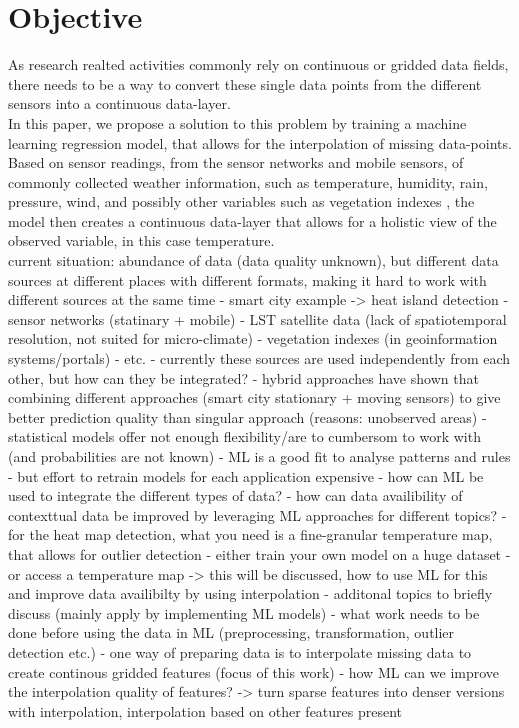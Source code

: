 \section{Objective}

As research realted activities commonly rely on continuous or gridded data fields, there needs to be a way to convert these single data points from the different sensors into a continuous data-layer.\\
In this paper, we propose a solution to this problem by training a machine learning regression model, that allows for the interpolation of missing data-points. Based on sensor readings, from the sensor networks and mobile sensors, of commonly collected weather information, such as temperature, humidity, rain, pressure, wind, and possibly other variables such as vegetation indexes \cite{alonso2020new}, the model then creates a continuous data-layer that allows for a holistic view of the observed variable, in this case temperature.\\

current situation: abundance of data (data quality unknown), but different data sources at different places with different formats, making it hard to work with different sources at the same time
- smart city example -> heat island detection
    - sensor networks (statinary + mobile)
    - LST satellite data (lack of spatiotemporal resolution, not suited for micro-climate)
    - vegetation indexes (in geoinformation systems/portals)
    - etc.
- currently these sources are used independently from each other, but how can they be integrated?
    - hybrid approaches have shown that combining different approaches (smart city stationary + moving sensors) to give better prediction quality than singular approach (reasons: unobserved areas)
    - statistical models offer not enough flexibility/are to cumbersom to work with (and probabilities are not known)
    - ML is a good fit to analyse patterns and rules
        - but effort to retrain models for each application expensive
- how can ML be used to integrate the different types of data?
- how can data availibility of contexttual data be improved by leveraging ML approaches for different topics?
    - for the heat map detection, what you need is a fine-granular temperature map, that allows for outlier detection
        - either train your own model on a huge dataset
        - or access a temperature map -> this will be discussed, how to use ML for this and improve data availibilty by using interpolation
- additonal topics to briefly discuss (mainly apply by implementing ML models) 
    - what work needs to be done before using the data in ML (preprocessing, transformation, outlier detection etc.)
        - one way of preparing data is to interpolate missing data to create continous gridded features (focus of this work)
        - how ML can we improve the interpolation quality of features? -> turn sparse features into denser versions with interpolation, interpolation based on other features present

